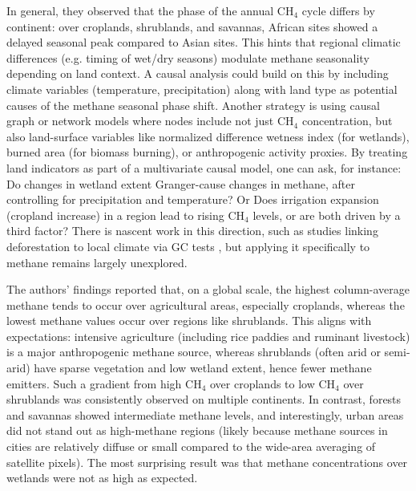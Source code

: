 In general, they observed that the phase of the annual CH$_4$ cycle differs by continent: over croplands, shrublands, and savannas, African sites showed a delayed seasonal peak compared to Asian sites. This hints that regional climatic differences (e.g. timing of wet/dry seasons) modulate methane seasonality depending on land context. A causal analysis could build on this by including climate variables (temperature, precipitation) along with land type as potential causes of the methane seasonal phase shift. Another strategy is using causal graph or network models where nodes include not just CH$_4$ concentration, but also land-surface variables like normalized difference wetness index (for wetlands), burned area (for biomass burning), or anthropogenic activity proxies. By treating land indicators as part of a multivariate causal model, one can ask, for instance: Do changes in wetland extent Granger-cause changes in methane, after controlling for precipitation and temperature? Or Does irrigation expansion (cropland increase) in a region lead to rising CH$_4$ levels, or are both driven by a third factor? There is nascent work in this direction, such as studies linking deforestation to local climate via GC tests \cite{Kovacs2023}, but applying it specifically to methane remains largely unexplored.

The authors' findings reported that, on a global scale, the highest column-average methane tends to occur over agricultural areas, especially croplands, whereas the lowest methane values occur over regions like shrublands. This aligns with expectations: intensive agriculture (including rice paddies and ruminant livestock) is a major anthropogenic methane source, whereas shrublands (often arid or semi-arid) have sparse vegetation and low wetland extent, hence fewer methane emitters. Such a gradient from high CH$_4$ over croplands to low CH$_4$ over shrublands was consistently observed on multiple continents. In contrast, forests and savannas showed intermediate methane levels, and interestingly, urban areas did not stand out as high-methane regions (likely because methane sources in cities are relatively diffuse or small compared to the wide-area averaging of satellite pixels). The most surprising result was that methane concentrations over wetlands were not as high as expected.

